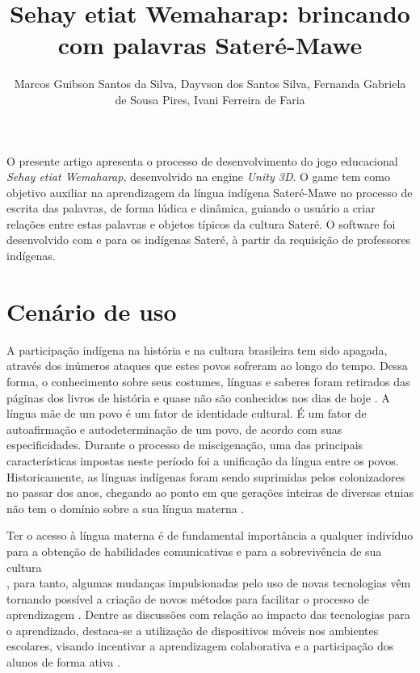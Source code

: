 \documentclass[12pt]{article}
\title{Sehay etiat Wemaharap: brincando com palavras Sateré-Mawe}
\author{Marcos Guibson Santos da Silva\inst{1}, Dayvson dos Santos Silva\inst{1}, Fernanda Gabriela\\ de Sousa Pires\inst{1}, Ivani Ferreira de Faria\inst{2} }
\begin{document}
 

\maketitle
	
	\begin{resumo} 
		O presente artigo apresenta o processo de desenvolvimento do jogo educacional  \textit{Sehay etiat Wemaharap}, desenvolvido na engine \textit{Unity 3D}. O game tem como objetivo auxiliar na aprendizagem da língua indígena Sateré-Mawe no processo de escrita das palavras, de forma lúdica e dinâmica, guiando o usuário a criar relações entre estas palavras e objetos típicos da cultura Sateré. O software foi desenvolvido com e para os indígenas Sateré, à partir da requisição de professores indígenas.
	\end{resumo}
	
	\section{Cenário de uso}
		A participação indígena na história e na cultura brasileira tem sido apagada, através dos inúmeros ataques que estes povos sofreram ao longo do tempo. Dessa forma, o conhecimento sobre seus costumes, línguas e saberes foram retirados das páginas dos livros de história e quase não são conhecidos nos dias de hoje \cite{seki2000linguas}. A língua mãe de um povo é um fator de identidade cultural. É um fator de autoafirmação e autodeterminação de um povo, de acordo com suas especificidades. Durante o processo de miscigenação, uma das principais características impostas neste período foi a unificação da língua entre os povos. Historicamente, as línguas indígenas foram sendo suprimidas pelos colonizadores no passar dos anos, chegando ao ponto em que gerações inteiras de diversas etnias não tem o domínio sobre a sua língua materna \cite{cunha2008politicas}.
		
		Ter o acesso à língua materna é de fundamental importância a qualquer indivíduo para a obtenção de habilidades comunicativas e para a sobrevivência de sua cultura\\ \cite{2018livro}, para tanto, algumas mudanças impulsionadas pelo uso de novas tecnologias vêm tornando possível a criação de novos métodos para facilitar o processo de aprendizagem \cite{yamato2017amargana}. Dentre as discussões com relação ao impacto das tecnologias para o aprendizado, destaca-se a utilização de dispositivos móveis nos ambientes escolares, visando incentivar a aprendizagem colaborativa e a participação dos alunos de forma ativa \cite{rossing2012ilearning}.
		
\end{document}
